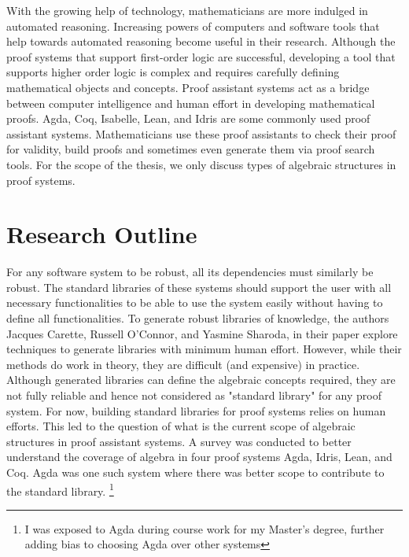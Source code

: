 With the growing help of technology, mathematicians are more indulged in
automated reasoning. Increasing powers of computers and software tools that help
towards automated reasoning become useful in their research. Although the proof
systems that support first-order logic are successful, developing a tool that
supports higher order logic is complex \cite{phillips2010automated} and requires
carefully defining mathematical objects and concepts. Proof assistant systems act
as a bridge between computer intelligence and human effort in developing
mathematical proofs. Agda, Coq, Isabelle, Lean, and Idris are some commonly used
proof assistant systems. Mathematicians use these proof assistants to check
their proof for validity, build proofs and sometimes even generate them via
proof search tools. For the scope of the thesis, we only discuss types of
algebraic structures in proof systems.

\section{Research Outline}
For any software system to be robust, all its dependencies must similarly be
robust. The standard libraries of these systems should support the user with all
necessary functionalities to be able to use the system easily without having to
define all functionalities. To generate robust libraries of knowledge, the
authors Jacques Carette, Russell O'Connor, and Yasmine Sharoda, in their paper
\cite{BuildingDiamond} explore techniques to generate libraries with minimum
human effort. However, while their methods do work in theory, they are difficult
(and expensive) in practice. Although generated libraries can define the
algebraic concepts required, they are not fully reliable and hence not
considered as "standard library" for any proof system. For now, building
standard libraries for proof systems relies on human efforts. This led to the
question of what is the current scope of algebraic structures in proof assistant
systems. A survey was conducted to better understand the coverage of algebra in
four proof systems Agda, Idris, Lean, and Coq. Agda was one such system where
there was better scope to contribute to the standard library. \footnote{I was
exposed to Agda during course work for my Master's degree, further adding bias
to choosing Agda over other systems} 

